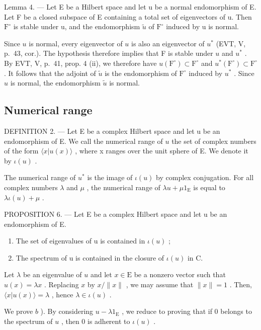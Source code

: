 Lemma 4. — Let E be a Hilbert space and let u be a normal endomorphism of E. Let F be a closed subspace of E containing a total set of eigenvectors of u. Then \(\mathrm{F}^{\circ}\) is stable under u, and the endomorphism \(\widetilde{u}\) of \(\mathrm{F}^{\circ}\) induced by u is normal.

Since \(u\) is normal, every eigenvector of \(u\) is also an eigenvector of \(u^{*}\) (EVT, V, p.~43, cor.). The hypothesis therefore implies that F is stable under \(u\) and \(u^{*}\) . By EVT, V, p.~41, prop. 4 (ii), we therefore have \(u(\mathrm{F}^{\circ}) \subset \mathrm{F}^{\circ}\) and \(u^{*}(\mathrm{F}^{\circ}) \subset \mathrm{F}^{\circ}\) . It follows that the adjoint of \(\widetilde{u}\) is the endomorphism of \(\mathrm{F}^{\circ}\) induced by \(u^{*}\) . Since \(u\) is normal, the endomorphism \(\widetilde{u}\) is normal.

\subsection{Numerical range}

DEFINITION 2. --- Let E be a complex Hilbert space and let u be an endomorphism of E. We call the numerical range of \(u\) the set of complex numbers of the form \(\langle x|u(x)\rangle\) , where x ranges over the unit sphere of E. We denote it by \(\iota(u)\) .

The numerical range of \(u^{*}\) is the image of \(\iota(u)\) by complex conjugation. For all complex numbers \(\lambda\) and \(\mu\) , the numerical range of \(\lambda u + \mu 1_{\mathrm{E}}\) is equal to \(\lambda \iota(u) + \mu\) .

PROPOSITION 6. — Let E be a complex Hilbert space and let u be an endomorphism of E.

\begin{enumerate}
\def\labelenumi{\alph{enumi})}
\item
  The set of eigenvalues of u is contained in \(\iota(u)\) ;
\item
  The spectrum of u is contained in the closure of \(\iota(u)\) in C.
\end{enumerate}

Let \(\lambda\) be an eigenvalue of \(u\) and let \(x \in \mathrm{E}\) be a nonzero vector such that \(u(x) = \lambda x\) . Replacing \(x\) by \(x / \| x\|\) , we may assume that \(\| x \| = 1\) . Then, \(\langle x | u(x) \rangle = \lambda\) , hence \(\lambda \in \iota(u)\) .

We prove \(b\) ). By considering \(u - \lambda 1_{\mathrm{E}}\) , we reduce to proving that if 0 belongs to the spectrum of \(u\) , then 0 is adherent to \(\iota(u)\) .

